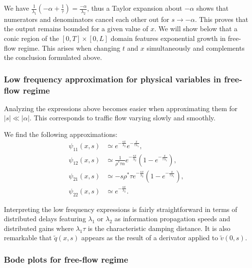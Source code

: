 \documentclass[a4paper, 10pt, conference]{ieeeconf}      %
\begin{document}
We have $\frac{1}{\lambda_{1}}\left(-\alpha+\frac{1}{\tau}\right) = \frac{-\alpha}{\lambda_{2}}$, thus a Taylor expansion about $-\alpha$ shows that numerators and denominators cancel each other out for $s \rightarrow -\alpha$. This proves that the output remains bounded for a given value of $x$. We will show below that a conic region of the $\left[0,T\right] \times \left[0,L\right]$ domain features exponential growth in free-flow regime. This arises when changing $t$ and $x$ simultaneously and complements the conclusion formulated above.\\

\subsubsection{Low frequency approximation for physical variables in free-flow regime}
Analyzing the expressions above becomes easier when approximating them for $\left|s\right|\ll\left|\alpha\right|$. This corresponds to traffic flow varying slowly and smoothly. 

We find the following approximations:
{\footnotesize
\begin{subequations}
\begin{align}
\psi_{11}(x,s)
&\simeq
e^{-\frac{sx}{\lambda_{2}}}
e^{-\frac{x}{\tau\lambda_{1}}}
, \\
\psi_{12}(x,s)
&\simeq
\frac{
	1
}{
	\rho^{*}\tau\alpha
}
e^{-\frac{sx}{\lambda_{2}}}
\left(
	1 - e^{-\frac{x}{\tau\lambda_{1}}}
\right)
, \\
\psi_{21}(x,s)
& \simeq
- s \rho^{*} \tau
e^{-\frac{sx}{\lambda_{2}}}
\left(
	1 - e^{-\frac{x}{\tau\lambda_{1}}}
\right)
, \\
\psi_{22}(x,s)
&\simeq
e^{-\frac{sx}{\lambda_{2}}}
.
\end{align}
\end{subequations}
}

Interpreting the low frequency expressions is fairly straightforward in terms of distributed delays featuring $\lambda_1$ or $\lambda_2$ as information propagation speeds and distributed gains where $\lambda_1 \tau$ is the characteristic damping distance. It is also remarkable that $\widetilde{q}(x,s)$ appears as the result of a derivator applied to $\widetilde{v}(0,s)$.\\

\subsubsection{Bode plots for free-flow regime}
\end{document}
